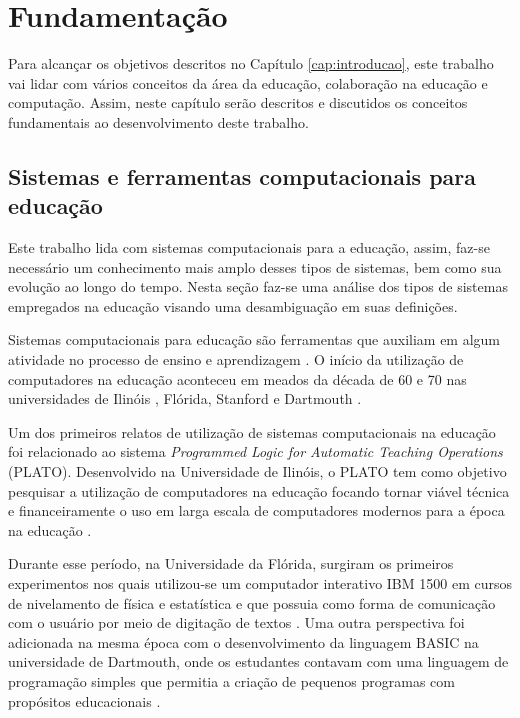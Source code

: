 \fi

\chapter{Fundamentação}
\label{cap:fundamentacao}

Para alcançar os objetivos descritos no Capítulo \ref{cap:introducao}, este trabalho vai lidar com vários conceitos da área da educação, colaboração na educação e computação. Assim, neste capítulo serão descritos e discutidos os conceitos fundamentais ao desenvolvimento deste trabalho.

\section{Sistemas e ferramentas computacionais para educação}



Este trabalho lida com sistemas computacionais para a educação, assim, faz-se necessário um conhecimento mais amplo desses tipos de sistemas, bem como sua evolução ao longo do tempo. Nesta seção faz-se uma análise dos tipos de sistemas empregados na educação visando uma desambiguação em suas definições.

Sistemas computacionais para educação são ferramentas que auxiliam em algum atividade no processo de ensino e aprendizagem \cite{tchounikine11}. O início da utilização de computadores na educação aconteceu em meados da década de 60 e 70 nas universidades de Ilinóis \cite{plato}, Flórida, Stanford e Dartmouth \cite{chambers80}.

Um dos primeiros relatos de utilização de sistemas computacionais na educação foi relacionado ao sistema \emph{Programmed Logic for Automatic Teaching Operations} (PLATO). Desenvolvido na Universidade de Ilinóis, o PLATO tem como objetivo pesquisar a utilização de computadores na educação focando tornar viável técnica e financeiramente o uso em larga escala de computadores modernos para a época na educação \cite{plato}.

Durante esse período, na Universidade da Flórida, surgiram os primeiros experimentos nos quais utilizou-se um computador interativo IBM 1500 em cursos de nivelamento de física e estatística e que possuia como forma de comunicação com o usuário por meio de digitação de textos \cite{chambers80}. Uma outra perspectiva foi adicionada na mesma época com o desenvolvimento da linguagem BASIC na universidade de Dartmouth, onde os estudantes contavam com uma linguagem de programação simples que permitia a criação de pequenos programas com propósitos educacionais \cite{chambers80}. 

